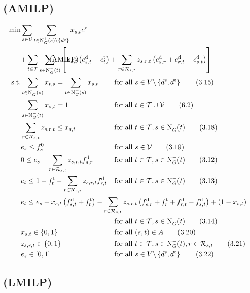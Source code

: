 \newpage
\subsection*{(AMILP)}

\begin{align}
	\min & \sum_{s\in\mathcal{V}} \sum_{t\in\Nout(s)\backslash\{d^{\operatorname{e}}\}} x_{s,t}\cv \nonumber \\
	& \omit\rlap{$\displaystyle{ + \sum_{t\in\mathcal{T}} \sum_{s\in\Nin(t)} \left[x_{s,t}\left(\cd_{s,t}+\ct_t\right) + \sum_{r\in\Rst} z_{s,r,t}\left(\cd_{s,r}+\cd_{r,t}-\cd_{s,t}\right)\right]}$} \tag{AMILP} \label{eq:Knoll:AMILP} \\
	\text{s.t.} & \sum_{t\in\Nin(s)} x_{t,s} = \sum_{t\in\Nout(s)} x_{s,t} & & \text{for all } s\in V\backslash\left\{d^{\operatorname{s}},d^{\operatorname{e}}\right\} \tag{3.15} \\
	& \sum_{s\in\Nin(t)} x_{s,t} = 1 & & \text{for all } t\in\mathcal{T}\cup\mathcal{V} \tag{6.2} \\
	& \sum_{r\in\Rst} z_{s,r,t} \leq x_{s,t} & & \text{for all } t\in\mathcal{T}, s\in\Nin(t) \tag{3.18} \\
	& e_s \leq f_s^0 & & \text{for all } s\in\mathcal{V} \tag{3.19} \\
	& 0 \leq e_s - \sum_{r\in\Rst} z_{s,r,t}\fd_{s,r} & & \text{for all } t\in\mathcal{T}, s\in\Nin(t) \tag{3.12} \\
	& e_t \leq 1 - \ft_t - \sum_{r\in\Rst} z_{s,r,t}\fd_{r,t} & & \text{for all } t\in\mathcal{T}, s\in\Nin(t) \tag{3.13} \\
	& \omit\rlap{$\displaystyle{e_t \leq e_s - x_{s,t}\left(f_{s,t}^{\operatorname{d}}+f_t^{\operatorname{t}}\right) - \sum_{r\in\Rst} z_{s,r,t}\left(\fd_{s,r}+\ft_r+\fd_{r,t}-\fd_{s,t}\right) + \left(1-x_{s,t}\right)}$} \nonumber \\
	& & & \text{for all } t\in\mathcal{T}, s\in\Nin(t) \tag{3.14} \\
	& x_{s,t}\in\{0,1\} & & \text{for all } (s,t)\in A \tag{3.20}\\
	& z_{s,r,t}\in\{0,1\} & & \text{for all } t\in\mathcal{T},s\in\Nin(t),r\in\Rst \tag{3.21} \\
	& e_s\in[0,1] & & \text{for all } s\in V\backslash\left\{d^{\operatorname{s}},d^{\operatorname{e}}\right\} \tag{3.22}
\end{align}

\newpage
\subsection*{(LMILP)}

